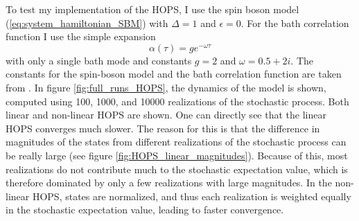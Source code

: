 To test my implementation of the HOPS, I use the spin boson model (\ref{eq:system_hamiltonian_SBM}) with $\Delta = 1$ and $\epsilon = 0$. 
For the bath correlation function I use the simple expansion
\begin{equation*}
    \alpha(\tau) = ge^{-\omega\tau}
\end{equation*}
with only a single bath mode and constants $g = 2$ and $\omega = 0.5 + 2i$. The constants for the spin-boson model
and the bath correlation function are taken from \cite{Suess:2014}. In figure \ref{fig:full_runs_HOPS}, the dynamics
of the model is shown, computed using 100, 1000, and 10000 realizations of the stochastic process. Both linear and non-linear 
HOPS are shown. One can directly see that the linear HOPS converges much slower. The reason for this is that the difference in 
magnitudes of the states from different realizations of the stochastic process can be really large (see figure \ref{fig:HOPS_linear_magnitudes}).
Because of this, most realizations do not contribute much to the stochastic expectation value, which is therefore dominated
by only a few realizations with large magnitudes. In the non-linear HOPS, states are normalized, and thus each realization
is weighted equally in the stochastic expectation value, leading to faster convergence.\\
  




